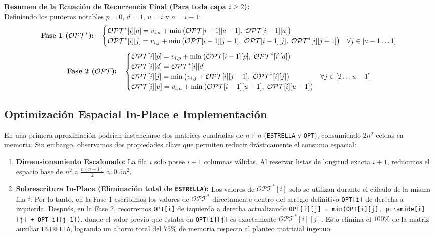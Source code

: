 \vspace{1ex}
\noindent\textbf{Resumen de la Ecuación de Recurrencia Final (Para toda capa $i \geq 2$):} \\
Definiendo los punteros notables $p = 0$, $d = 1$, $u = i$ y $a = i-1$:
\[
    \text{\textbf{Fase 1 ($\mathcal{OPT}^*$):}} \quad
    \begin{cases}
        \mathcal{OPT}^*[i][a] = v_{i,a} + \min\big(\mathcal{OPT}[i-1][a-1], \; \mathcal{OPT}[i-1][a]\big) \\
        \mathcal{OPT}^*[i][j] = v_{i,j} + \min\big(\mathcal{OPT}[i-1][j-1], \; \mathcal{OPT}[i-1][j], \; \mathcal{OPT}^*[i][j+1]\big) & \forall j \in [a-1 \dots 1]
    \end{cases}
\]
\[
    \text{\textbf{Fase 2 ($\mathcal{OPT}$):}} \quad
    \begin{cases}
        \mathcal{OPT}[i][p] = v_{i,p} + \min\big(\mathcal{OPT}[i-1][p], \; \mathcal{OPT}^*[i][d]\big) \\
        \mathcal{OPT}[i][d] = \mathcal{OPT}^*[i][d] \\
        \mathcal{OPT}[i][j] = \min\big(v_{i,j} + \mathcal{OPT}[i][j-1], \; \mathcal{OPT}^*[i][j]\big) & \forall j \in [2 \dots u-1] \\
        \mathcal{OPT}[i][u] = v_{i,u} + \min\big(\mathcal{OPT}[i-1][u-1], \; \mathcal{OPT}[i][u-1]\big)
    \end{cases}
\]

\subsection{Optimización Espacial In-Place e Implementación}\label{rec:codigo}

En una primera aproximación podrían instanciarse dos matrices cuadradas de $n \times n$ (\verb|ESTRELLA| y \verb|OPT|), consumiendo $2n^2$ celdas en memoria. Sin embargo, observamos dos propiedades clave que permiten reducir drásticamente el consumo espacial:
\begin{enumerate}
    \item \textbf{Dimensionamiento Escalonado:} La fila $i$ solo posee $i+1$ columnas válidas. Al reservar listas de longitud exacta $i+1$, reducimos el espacio base de $n^2$ a $\frac{n(n+1)}{2} \approx 0.5n^2$.
    \item \textbf{Sobrescritura In-Place (Eliminación total de \texttt{ESTRELLA}):} Los valores de $\mathcal{OPT}^*[i]$ solo se utilizan durante el cálculo de la misma fila $i$. Por lo tanto, en la Fase 1 escribimos los valores de $\mathcal{OPT}^*$ directamente dentro del arreglo definitivo \verb|OPT[i]| de derecha a izquierda. Después, en la Fase 2, recorremos \verb|OPT[i]| de izquierda a derecha actualizando \verb|OPT[i][j] = min(OPT[i][j], piramide[i][j] + OPT[i][j-1])|, donde el valor previo que estaba en \verb|OPT[i][j]| es exactamente $\mathcal{OPT}^*[i][j]$. Esto elimina el $100\%$ de la matriz auxiliar \verb|ESTRELLA|, logrando un ahorro total del $75\%$ de memoria respecto al planteo matricial ingenuo.
\end{enumerate}

